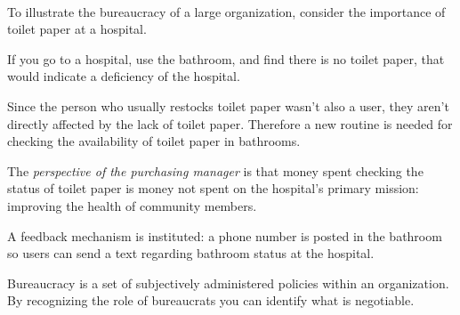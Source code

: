 \ \\
To illustrate the bureaucracy of a large organization, consider the importance of toilet paper at a hospital. 
\begin{mdframed}[frametitle={Restocking Toilet Paper},frametitlerule=true,frametitlealignment=\centering]
If you go to a hospital, use the bathroom, and find there is no toilet paper, that would indicate a deficiency of the hospital.

Since the person who usually restocks toilet paper wasn't also a user, they aren't directly affected by the lack of toilet paper. Therefore a new routine is needed for checking the availability of toilet paper in bathrooms. 

The \textit{perspective of the purchasing manager} is that money spent checking the status of toilet paper is money not spent on the hospital's primary mission: improving the health of community members.

A feedback mechanism is instituted: a phone number is posted in the bathroom so users can send a text regarding bathroom status at the hospital.


\end{mdframed}






Bureaucracy is a set of subjectively administered policies within an organization. By recognizing the role of bureaucrats you can identify what is negotiable. 
